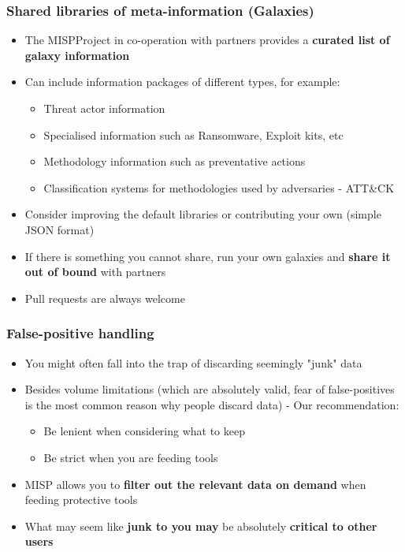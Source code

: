 \begin{frame}
\frametitle{Shared libraries of meta-information (Galaxies)}
\begin{itemize}
    \item The MISPProject in co-operation with partners provides a {\bf curated list of galaxy information}
	\item Can include information packages of different types, for example:
	\begin{itemize}
		\item Threat actor information
		\item Specialised information such as Ransomware, Exploit kits, etc
		\item Methodology information such as preventative actions
		\item Classification systems for methodologies used by adversaries - ATT\&CK
	\end{itemize}
	\item Consider improving the default libraries or contributing your own (simple JSON format)
    \item If there is something you cannot share, run your own galaxies and {\bf share it out of bound} with partners
	\item Pull requests are always welcome
\end{itemize}
\end{frame}

\begin{frame}
\frametitle{False-positive handling}
\begin{itemize}
	\item You might often fall into the trap of discarding seemingly "junk" data
	\item Besides volume limitations (which are absolutely valid, fear of false-positives is the most common reason why people discard data) - Our recommendation:
	\begin{itemize}
		\item Be lenient when considering what to keep
		\item Be strict when you are feeding tools
	\end{itemize}
\item MISP allows you to {\bf filter out the relevant data on demand} when feeding protective tools
\item What may seem like {\bf junk to you may} be absolutely {\bf critical to other users}
\end{itemize}
\end{frame}

